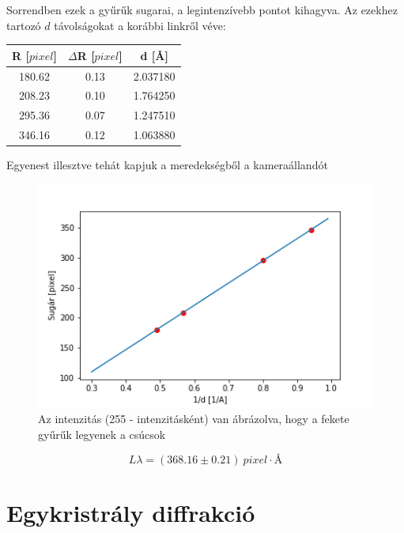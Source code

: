 \documentclass[a4paper,12pt]{article}
\begin{document}
\par Sorrendben ezek a gyűrűk sugarai, a legintenzívebb pontot kihagyva. Az ezekhez tartozó $d$ távolságokat a korábbi linkről véve:

\vspace{5mm}

\begin{center}
\begin{tabular}{|c|c|c|}
\hline
R [$pixel$] & $\Delta$R [$pixel$] & d [\si{\angstrom}] \\
\hline
180.62 & 0.13 & 2.037180\\
\hline
208.23 & 0.10 & 1.764250 \\
\hline
295.36 & 0.07 & 1.247510\\
\hline
346.16 & 0.12 & 1.063880\\
\hline
\end{tabular}
\end{center}

\vspace{5mm}

\par Egyenest illesztve tehát kapjuk a meredekségből a kameraállandót

\vspace{5mm}

\begin{figure}[!htb]
\centering
\includegraphics[width=0.45\linewidth]{./kalib_egyenes.png}
\caption{ Az intenzitás (255 - intenzitásként) van ábrázolva, hogy a fekete gyűrűk legyenek a csúcsok}
\end{figure}

\vspace{5mm}

\begin{equation}
L\lambda = (368.16 \pm 0.21) ~pixel\cdot \si{\angstrom}
\end{equation}

\vspace{5mm}

\section{Egykristrály diffrakció}
\end{document}

